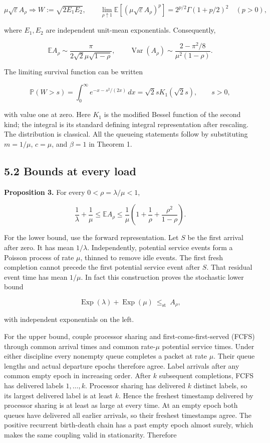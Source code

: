 \documentclass[
  11pt,
  a4paper,
]{scrartcl}
\newcounter{none} %
\begin{document}
\[
\mu\sqrt\varepsilon A_\rho\Rightarrow W:=\sqrt{2E_1E_2},
\qquad
\lim_{\rho\uparrow1}\mathbb E[(\mu\sqrt\varepsilon A_\rho)^p]
=2^{p/2}\Gamma(1+p/2)^2\quad(p>0),
\tag{M1}
\]

where \(E_1,E_2\) are independent unit-mean exponentials. Consequently,

\[
\mathbb EA_\rho\sim\frac{\pi}{2\sqrt2\mu\sqrt{1-\rho}},
\qquad
\operatorname{Var}(A_\rho)\sim
\frac{2-\pi^2/8}{\mu^2(1-\rho)}.
\tag{M2}
\]

The limiting survival function can be written

\[
\mathbb P(W>s)=\int_0^\infty e^{-x-s^2/(2x)}\,dx
=\sqrt2s K_1(\sqrt2s),\qquad s>0,
\tag{M3}
\]

with value one at zero. Here \(K_1\) is the modified Bessel function of
the second kind; the integral is its standard defining integral
representation after rescaling. The distribution is classical. All the
queueing statements follow by substituting \(m=1/\mu\), \(c=\mu\), and
\(\beta=1\) in Theorem 1.

\subsection{5.2 Bounds at every load}\label{bounds-at-every-load}

\textbf{Proposition 3.} For every \(0<\rho=\lambda/\mu<1\),

\[
\frac1\lambda+\frac1\mu
\leq\mathbb EA_\rho
\leq\frac1\mu\left(1+\frac1\rho+\frac{\rho^2}{1-\rho}\right).
\tag{M4}
\]

For the lower bound, use the forward representation. Let \(S\) be the
first arrival after zero. It has mean \(1/\lambda\). Independently,
potential service events form a Poisson process of rate \(\mu\), thinned
to remove idle events. The first fresh completion cannot precede the
first potential service event after \(S\). That residual event time has
mean \(1/\mu\). In fact this construction proves the stochastic lower
bound

\[
\operatorname{Exp}(\lambda)+\operatorname{Exp}(\mu)
\ \leq_{\mathrm{st}}\ A_\rho,
\tag{M5}
\]

with independent exponentials on the left.

For the upper bound, couple processor sharing and
first-come-first-served (FCFS) through common arrival times and common
rate-\(\mu\) potential service times. Under either discipline every
nonempty queue completes a packet at rate \(\mu\). Their queue lengths
and actual departure epochs therefore agree. Label arrivals after any
common empty epoch in increasing order. After \(k\) subsequent
completions, FCFS has delivered labels \(1,\ldots,k\). Processor sharing
has delivered \(k\) distinct labels, so its largest delivered label is
at least \(k\). Hence the freshest timestamp delivered by processor
sharing is at least as large at every time. At an empty epoch both
queues have delivered all earlier arrivals, so their freshest timestamps
agree. The positive recurrent birth-death chain has a past empty epoch
almost surely, which makes the same coupling valid in stationarity.
Therefore
\end{document}
